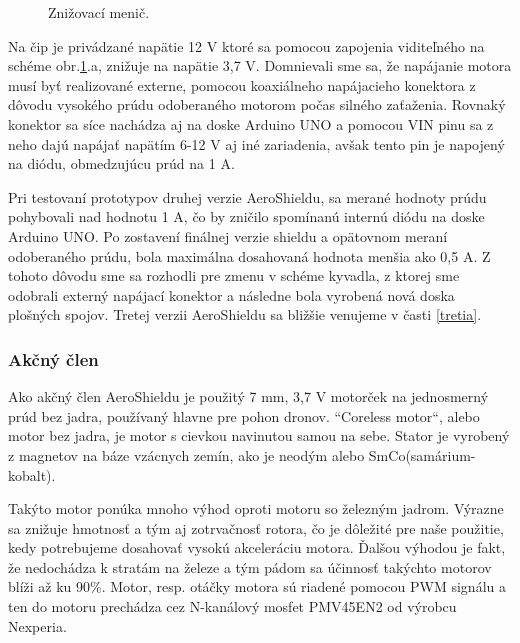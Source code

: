 \begin{figure}[!tbh]
	\hfill
	\hfill
	\hfill
	\caption{Znižovací menič.}\label{OBRAZOK 2.1}
\end{figure}

Na čip je privádzané napätie 12 V ktoré sa pomocou zapojenia viditeľného na schéme obr.\ref{OBRAZOK 2.1}.a, znižuje na napätie 3,7 V. Domnievali sme sa, že napájanie motora musí byť realizované externe, pomocou koaxiálneho napájacieho konektora z dôvodu vysokého prúdu odoberaného motorom počas silného zaťaženia. Rovnaký konektor sa síce nachádza aj na doske Arduino UNO a pomocou VIN pinu sa z neho dajú napájať napätím 6-12 V aj iné zariadenia, avšak tento pin je napojený na diódu, obmedzujúcu prúd na 1 A\cite{ampere}\cite{ampere2}. 

Pri testovaní prototypov druhej verzie AeroShieldu, sa merané hodnoty prúdu pohybovali nad hodnotu 1 A, čo by zničilo spomínanú internú diódu na doske Arduino UNO. 
Po zostavení finálnej verzie shieldu a opätovnom meraní odoberaného prúdu, bola maximálna dosahovaná hodnota menšia ako 0,5 A. Z tohoto dôvodu sme sa rozhodli pre zmenu v schéme kyvadla, z ktorej sme odobrali externý napájací konektor a následne bola vyrobená nová doska plošných spojov. Tretej verzii AeroShieldu sa bližšie venujeme v časti \ref{tretia}.

\subsubsection{Akčný člen}
\label{akcclen}

Ako akčný člen AeroShieldu je použitý 7 mm, 3,7 V motorček na jednosmerný prúd bez jadra, používaný hlavne pre pohon dronov. “Coreless motor“, alebo motor bez jadra, je motor s cievkou navinutou samou na sebe\cite{coreless}. Stator je vyrobený z magnetov na báze vzácnych zemín, ako je neodým alebo SmCo(samárium-kobalt).

Takýto motor ponúka mnoho výhod oproti motoru so železným jadrom. Výrazne sa znižuje hmotnosť a tým aj zotrvačnosť rotora, čo je dôležité pre naše použitie, kedy potrebujeme dosahovať vysokú akceleráciu motora. Ďalšou výhodou je fakt, že nedochádza k stratám na železe a tým pádom sa účinnosť takýchto motorov blíži až ku 90\%\cite{5545147}. Motor, resp. otáčky motora sú riadené pomocou PWM signálu a ten do motoru prechádza cez N-kanálový mosfet PMV45EN2 od výrobcu Nexperia\cite{pmv}.


